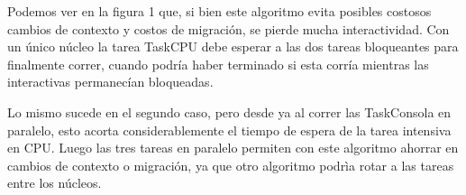 Podemos ver en la figura 1 que, si bien este algoritmo evita posibles costosos cambios de contexto y costos de migración, se pierde mucha interactividad. Con un único núcleo la tarea TaskCPU debe esperar a las dos tareas bloqueantes para finalmente correr, cuando podría haber terminado si esta corría mientras las interactivas permanecían bloqueadas.

Lo mismo sucede en el segundo caso, pero desde ya al correr las TaskConsola en paralelo, esto acorta considerablemente el tiempo de espera de la tarea intensiva en CPU. Luego las tres tareas en paralelo permiten con este algoritmo ahorrar en cambios de contexto o migración, ya que otro algoritmo podrìa rotar a las tareas entre los núcleos.



